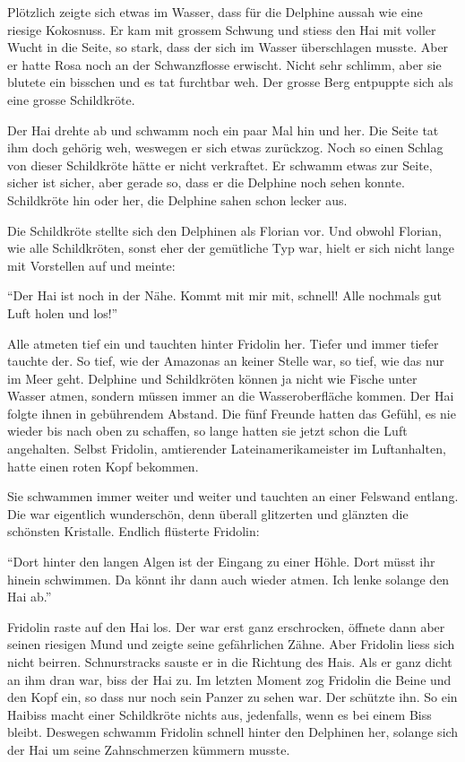 Plötzlich zeigte sich etwas im Wasser, dass für die Delphine aussah wie eine riesige Kokosnuss. Er kam mit grossem Schwung und stiess den Hai mit voller Wucht in die Seite, so stark, dass der sich im Wasser überschlagen musste.  Aber er hatte Rosa noch an der Schwanzflosse erwischt. Nicht sehr schlimm, aber sie blutete ein bisschen und es tat furchtbar weh. Der grosse Berg entpuppte sich als eine grosse Schildkröte. 

Der Hai drehte ab und schwamm noch ein paar Mal hin und her. Die Seite tat ihm doch gehörig weh, weswegen er sich etwas zurückzog. Noch so einen Schlag von dieser Schildkröte hätte er nicht verkraftet. Er schwamm etwas zur Seite, sicher ist sicher, aber gerade so, dass er die Delphine noch sehen konnte. Schildkröte hin oder her, die Delphine sahen schon lecker aus.

Die Schildkröte stellte sich den Delphinen als Florian vor. Und obwohl Florian, wie alle Schildkröten, sonst eher der gemütliche Typ war, hielt er sich nicht lange mit Vorstellen auf und meinte: 

\enquote{Der Hai ist noch in der Nähe. Kommt mit mir mit, schnell! Alle nochmals gut Luft holen und los!}

Alle atmeten tief ein und tauchten hinter Fridolin her. Tiefer und immer tiefer tauchte der. So tief, wie der Amazonas an keiner Stelle war, so tief, wie das nur im Meer geht. Delphine und Schildkröten können ja nicht wie Fische unter Wasser atmen, sondern müssen immer an die Wasseroberfläche kommen. Der Hai folgte ihnen in gebührendem Abstand. Die fünf Freunde hatten das Gefühl, es nie wieder bis nach oben zu schaffen, so lange hatten sie jetzt schon die Luft angehalten. Selbst Fridolin, amtierender Lateinamerikameister im Luftanhalten, hatte einen roten Kopf bekommen. 

Sie schwammen immer weiter und weiter und tauchten an einer Felswand entlang. Die war eigentlich wunderschön, denn überall glitzerten und glänzten die schönsten Kristalle. Endlich flüsterte Fridolin:

\enquote{Dort hinter den langen Algen ist der Eingang zu einer Höhle. Dort müsst ihr hinein schwimmen. Da könnt ihr dann auch wieder atmen. Ich lenke solange den Hai ab.}

Fridolin raste auf den Hai los. Der war erst ganz erschrocken, öffnete dann aber seinen riesigen Mund und zeigte seine gefährlichen Zähne. Aber Fridolin liess sich nicht beirren. Schnurstracks sauste er in die Richtung des Hais. Als er ganz dicht an ihm dran war, biss der Hai zu. Im letzten Moment zog Fridolin die Beine und den Kopf ein, so dass nur noch sein Panzer zu sehen war. Der schützte ihn. So ein Haibiss macht einer Schildkröte nichts aus, jedenfalls, wenn es bei einem Biss bleibt. Deswegen schwamm Fridolin schnell hinter den Delphinen her, solange sich der Hai um seine Zahnschmerzen kümmern musste.

